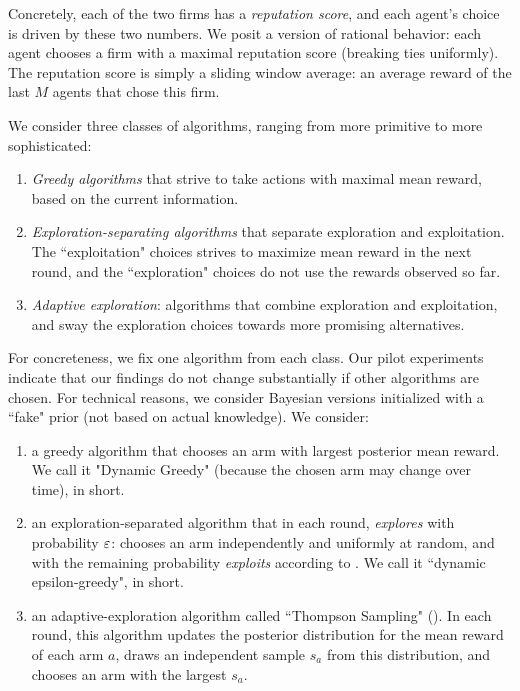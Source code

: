 \documentclass[../competing_bandits.tex]{subfiles}
\begin{document}
Concretely, each of the two firms has a \emph{reputation score}, and each agent's choice is driven by these two numbers. We posit a version of rational behavior: each agent chooses a firm with a maximal reputation score (breaking ties uniformly). The reputation score is simply a sliding window average: an average reward of the last $M$ agents that chose this firm.


 We consider three classes of algorithms, ranging from more primitive to more sophisticated:

\begin{enumerate}
\item \emph{Greedy algorithms} that strive to take actions with maximal mean reward, based on the current information.

\item \emph{Exploration-separating algorithms} that separate exploration and exploitation. The ``exploitation" choices strives to maximize mean reward in the next round, and the ``exploration" choices do not use the rewards observed so far.
\item \emph{Adaptive exploration}: algorithms that combine exploration and exploitation, and sway the exploration choices towards more promising alternatives.
\end{enumerate}

 For concreteness, we fix one algorithm from each class. Our pilot experiments indicate that our findings do not change substantially if other algorithms are chosen. For technical reasons, we consider Bayesian versions initialized with a ``fake" prior (\ie not based on actual knowledge). We consider:

\begin{enumerate}
\item a greedy algorithm that chooses an arm with largest posterior mean reward. We call it "Dynamic Greedy" (because the chosen arm may change over time), \DG in short.

\item an exploration-separated algorithm that in each round, \emph{explores} with probability $\varepsilon$: chooses an arm independently and uniformly at random, and with the remaining probability \emph{exploits} according to \DG. We call it ``dynamic epsilon-greedy", \DEG in short.

\item an adaptive-exploration algorithm called ``Thompson Sampling" (\TS). In each round, this algorithm updates the posterior distribution for the mean reward of each arm $a$, draws an independent sample $s_a$ from this distribution, and chooses an arm with the largest $s_a$.
\end{enumerate}
\end{document}
